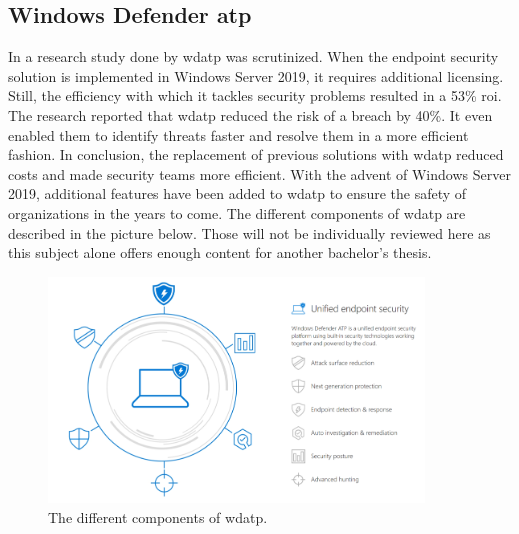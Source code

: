 \subsection{Windows Defender \acrfull{atp}}
In a research study done by \textcite{Musto2017} \acrfull{wdatp} was scrutinized. When the endpoint security solution is implemented in Windows Server 2019, it requires additional licensing. Still, the efficiency with which it tackles security problems resulted in a 53\% \acrfull{roi}. The research reported that \acrshort{wdatp} reduced the risk of a breach by 40\%. It even enabled them to identify threats faster and resolve them in a more efficient fashion. In conclusion, the replacement of previous solutions with \acrlong{wdatp} reduced costs and made security teams more efficient. With the advent of Windows Server 2019, additional features have been added to \acrlong{wdatp} to ensure the safety of organizations in the years to come. The different components of \acrshort{wdatp} are described in the picture below. Those will not be individually reviewed here as this subject alone offers enough content for another bachelor's thesis.

\begin{figure}[hbt!]
	\centering
	\includegraphics[width=\textwidth,height=6cm,keepaspectratio=true]{img/Windows-Defender-ATP.png}
	\caption[Components of \acrshort{wdatp}]{The different components of \acrlong{wdatp}. \autocite{Aslaner2018}}
	\label{fig:WDATPT2018}
\end{figure}

